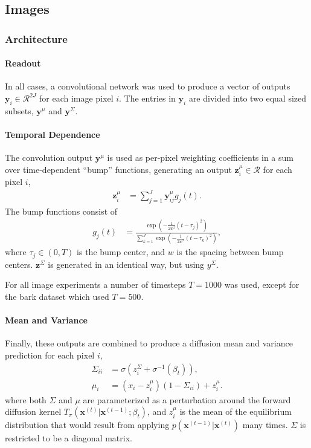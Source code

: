 \documentclass{article}
\newcommand{\mb}{\mathbf}
\newcommand{\mc}{\mathcal}
\newcommand{\qr}{p\left( \mb x^{(t-1)} | \mb x^{(t)} \right)}
\begin{document}
\subsection{Images}

\subsubsection{Architecture}\label{sec readout}
\paragraph{Readout}\label{sec readout}

In all cases, a convolutional network was used to produce a vector of outputs $\mb y_i \in \mc R^{2J}$ for each image pixel $i$. 
The entries in $\mb y_i$ are divided into two equal sized subsets, $\mb y^\mu$ and $\mb y^\Sigma$. 

\paragraph{Temporal Dependence}

The convolution output $\mb y^\mu$ is used as per-pixel weighting coefficients in a sum over time-dependent ``bump'' functions, 
generating an output $\mb z^\mu_i \in \mc R$ for each pixel $i$,
\begin{align}
\mb z^\mu_i &= \sum_{j=1}^J \mb y^\mu_{ij} g_j\left(t\right)
.
\end{align}
The bump functions consist of
\begin{align}
g_j\left(t\right) &= \frac{
	\exp\left( 
		-\frac{1}{2 w^2} \left( t - \tau_j \right)^2
	\right)
}{
	\sum_{k=1}^J
	\exp\left( 
		-\frac{1}{2 w^2} \left( t - \tau_k \right)^2
	\right)
}
,
\end{align}
where $\tau_j \in (0, T)$ is the bump center, and $w$ is the spacing between bump centers. 
$\mb z^\Sigma$ is generated in an identical way, but using $y^\Sigma$.

For all image experiments a number of timesteps $T=1000$ was used, except for the bark dataset which used $T=500$.

\paragraph{Mean and Variance}

Finally, these outputs are combined to produce a diffusion mean and variance prediction for each pixel $i$, 
\begin{align}
\Sigma_{ii} &= \sigma\left( z^\Sigma_i + \sigma^{-1}\left( \beta_t \right) \right), \\
\mu_i &= \left( x_i - z^\mu_i \right)\left(1 - \Sigma_{ii}\right) + z^\mu_i
.
\end{align}
where both $\Sigma$ and $\mu$ are parameterized as a perturbation around the forward diffusion kernel $T_\pi\left( \mb x^{(t)} | \mb x^{(t-1)}; \beta_t \right)$, 
and $z^\mu_i$ is the mean of the equilibrium distribution that would result from applying $\qr$ many times. $\Sigma$ is restricted to be a diagonal matrix.
\end{document}
